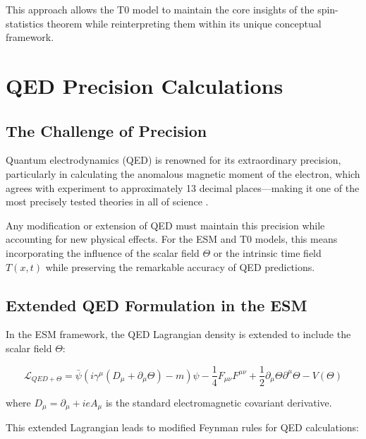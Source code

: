 \documentclass[12pt,a4paper]{article}
\newcommand{\Tfieldt}{T(x,t)}
\begin{document}
	This approach allows the T0 model to maintain the core insights of the spin-statistics theorem while reinterpreting them within its unique conceptual framework.
	
	\section{QED Precision Calculations}
	\label{sec:qed_calculations}
	
	\subsection{The Challenge of Precision}
	\label{subsec:precision_challenge}
	
	Quantum electrodynamics (QED) is renowned for its extraordinary precision, particularly in calculating the anomalous magnetic moment of the electron, which agrees with experiment to approximately 13 decimal places—making it one of the most precisely tested theories in all of science \cite{Hanneke2008}.
	
	Any modification or extension of QED must maintain this precision while accounting for new physical effects. For the ESM and T0 models, this means incorporating the influence of the scalar field $\Theta$ or the intrinsic time field $\Tfieldt$ while preserving the remarkable accuracy of QED predictions.
	
	\subsection{Extended QED Formulation in the ESM}
	\label{subsec:extended_qed}
	
	In the ESM framework, the QED Lagrangian density is extended to include the scalar field $\Theta$:
	
	\begin{equation}
		\mathcal{L}_{QED+\Theta} = \bar{\psi}(i\gamma^{\mu}(D_{\mu} + \partial_{\mu}\Theta) - m)\psi - \frac{1}{4}F_{\mu\nu}F^{\mu\nu} + \frac{1}{2}\partial_{\mu}\Theta\partial^{\mu}\Theta - V(\Theta)
		\label{eq:extended_qed_lagrangian}
	\end{equation}
	
	where $D_{\mu} = \partial_{\mu} + ieA_{\mu}$ is the standard electromagnetic covariant derivative.
	
	This extended Lagrangian leads to modified Feynman rules for QED calculations:
	
\end{document}
